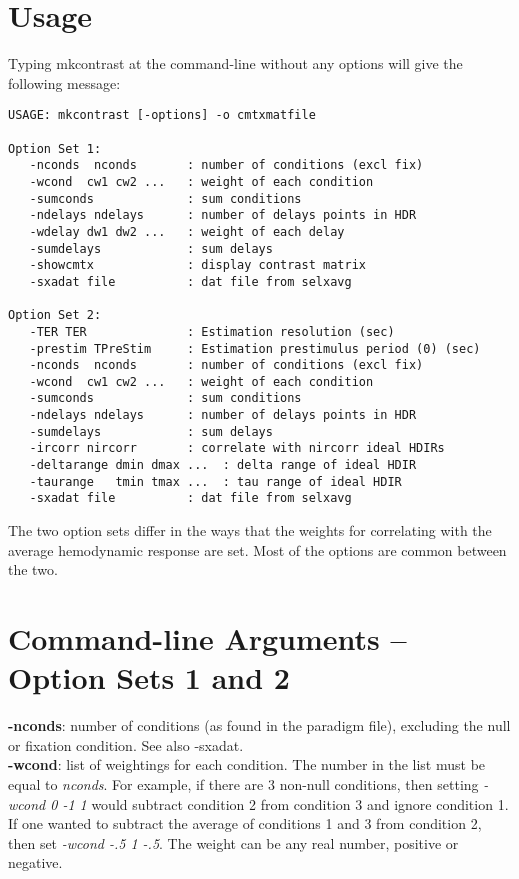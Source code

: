 \documentclass[10pt]{article}
\begin{document}
\section{Usage}
Typing mkcontrast at the command-line without any options will give the
following message:\\ 

\begin{small}
\begin{verbatim}
USAGE: mkcontrast [-options] -o cmtxmatfile 

Option Set 1:
   -nconds  nconds       : number of conditions (excl fix)
   -wcond  cw1 cw2 ...   : weight of each condition
   -sumconds             : sum conditions
   -ndelays ndelays      : number of delays points in HDR
   -wdelay dw1 dw2 ...   : weight of each delay
   -sumdelays            : sum delays
   -showcmtx             : display contrast matrix
   -sxadat file          : dat file from selxavg

Option Set 2:
   -TER TER              : Estimation resolution (sec)
   -prestim TPreStim     : Estimation prestimulus period (0) (sec)
   -nconds  nconds       : number of conditions (excl fix)
   -wcond  cw1 cw2 ...   : weight of each condition
   -sumconds             : sum conditions
   -ndelays ndelays      : number of delays points in HDR
   -sumdelays            : sum delays
   -ircorr nircorr       : correlate with nircorr ideal HDIRs
   -deltarange dmin dmax ...  : delta range of ideal HDIR
   -taurange   tmin tmax ...  : tau range of ideal HDIR
   -sxadat file          : dat file from selxavg

\end{verbatim}
\end{small}

The two option sets differ in the ways that the weights for
correlating with the average hemodynamic response are set.
Most of the options are common between the two.\\

\section{Command-line Arguments -- Option Sets 1 and 2}

\noindent
{\bf -nconds}: number of conditions (as found in the paradigm file),
excluding the null or fixation condition. See also -sxadat.\\

\noindent
{\bf -wcond}: list of weightings for each condition.  The number in
the list must be equal to {\em nconds}. For example, if there are 3
non-null conditions, then setting {\em -wcond 0 -1 1} would subtract
condition 2 from condition 3 and ignore condition 1.  If one wanted to
subtract the average of conditions 1 and 3 from condition 2, then set 
{\em -wcond -.5 1 -.5}.  The weight can be any real number, positive
or negative.\\
\end{document}
